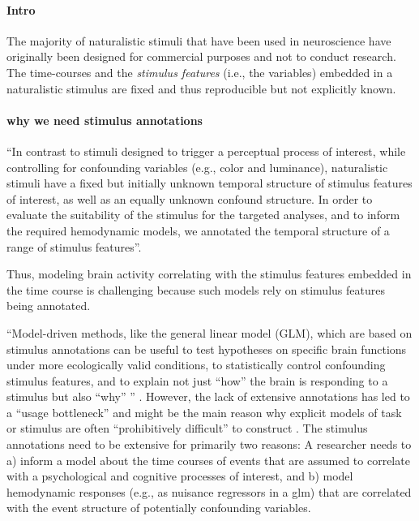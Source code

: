

\paragraph{Intro}


%
The majority of naturalistic stimuli that have been used in neuroscience have
originally been designed for commercial purposes and not to conduct research.
%
The time-courses and the \textit{stimulus features} (i.e., the variables)
embedded in a naturalistic stimulus are fixed and thus reproducible but not
explicitly known.

\paragraph{why we need stimulus annotations}

``In contrast to stimuli designed to trigger a perceptual process of interest,
while controlling for confounding variables (e.g., color and luminance),
naturalistic stimuli have a fixed but initially unknown temporal structure of
stimulus features of interest, as well as an equally unknown confound structure.
In order to evaluate the suitability of the stimulus for the targeted analyses,
and to inform the required hemodynamic models, we annotated the temporal
structure of a range of stimulus features''.

%
Thus, modeling brain activity correlating with the stimulus features embedded in
the time course is challenging \citep{saarimaki2021naturalistic,
simony2020analysis} because such models rely on stimulus features being
annotated.

``Model-driven methods, like the general linear model (GLM), which are based on
stimulus annotations can be useful to test hypotheses on specific brain
functions under more ecologically valid conditions, to statistically control
confounding stimulus features, and to explain not just ``how'' the brain is
responding to a stimulus but also ``why'' \citep{hamilton2018revolution}''
\citep{haeusler2022processing}.
%
However, the lack of extensive annotations has led to a ``usage bottleneck''
\citep{aliko2020naturalistic} and might be the main reason why explicit models
of task or stimulus are often ``prohibitively difficult'' to construct
\citep{nastase2019measuring}.
%
The stimulus annotations need to be extensive for primarily two reasons:
%
A researcher needs to a) inform a model about the time courses of events that
are assumed to correlate with a psychological and cognitive processes of
interest, and b) model hemodynamic responses (e.g., as nuisance regressors in a
\ac{glm}) that are correlated with the event structure of potentially
confounding variables.


